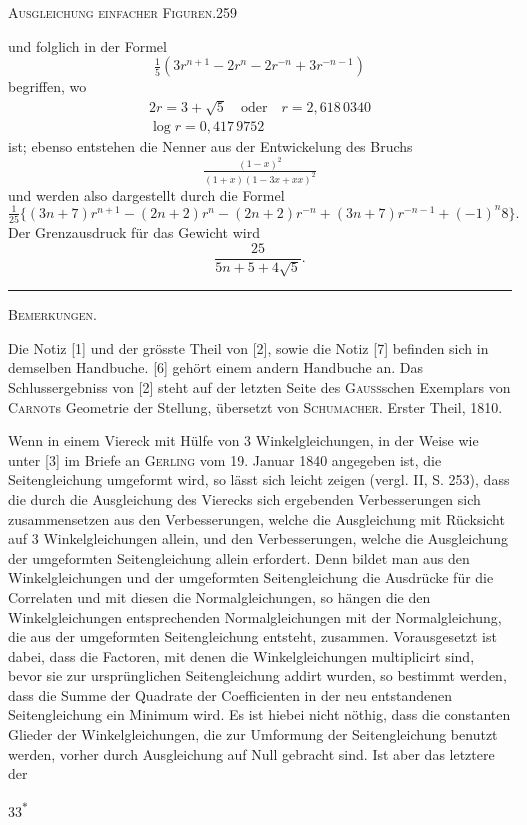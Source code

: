\clearpage
\noindent\mbox{}\hfill\textsc{Ausgleichung einfacher Figuren.}\hfill259\par\medskip
\noindent und folglich in der Formel
\[
\tfrac15(3r^{n+1}-2r^n-2r^{-n}+3r^{-n-1})
\]
\noindent begriffen, wo
\[
\begin{gathered}
2r=3+\sqrt5\quad\text{oder}\quad r=2{,}618\,0340\\
\log r=0{,}417\,9752
\end{gathered}
\]
\noindent ist; ebenso entstehen die Nenner aus der Entwickelung des Bruchs
\[
\tfrac{(1-x)^2}{(1+x)(1-3x+xx)^2}
\]
\noindent und werden also dargestellt durch die Formel
\[
\tfrac1{25}\{(3n+7)r^{n+1}-(2n+2)r^n-(2n+2)r^{-n}+(3n+7)r^{-n-1}+(-1)^n8\}.
\]
Der Grenzausdruck für das Gewicht wird
\[
\frac{25}{5n+5+4\sqrt5}.
\]
\begin{center}\rule{3cm}{.4pt}\end{center}
\bigskip
\begin{center}\textsc{Bemerkungen.}\end{center}
\begingroup\footnotesize
Die Notiz [1] und der grösste Theil von [2], sowie die Notiz [7] befinden sich in demselben Handbuche. [6] gehört einem andern Handbuche an. Das Schlussergebniss von [2] steht auf der letzten Seite des \textsc{Gauss}schen Exemplars von \textsc{Carnot}s Geometrie der Stellung, übersetzt von \textsc{Schumacher}. Erster Theil, 1810.

Wenn in einem Viereck mit Hülfe von 3 Winkelgleichungen, in der Weise wie unter [3] im Briefe an \textsc{Gerling} vom 19. Januar 1840 angegeben ist, die Seitengleichung umgeformt wird, so lässt sich leicht zeigen (vergl. II, S. 253), dass die durch die Ausgleichung des Vierecks sich ergebenden Verbesserungen sich zusammensetzen aus den Verbesserungen, welche die Ausgleichung mit Rücksicht auf 3 Winkelgleichungen allein, und den Verbesserungen, welche die Ausgleichung der umgeformten Seitengleichung allein erfordert. Denn bildet man aus den Winkelgleichungen und der umgeformten Seitengleichung die Ausdrücke für die Correlaten und mit diesen die Normalgleichungen, so hängen die den Winkelgleichungen entsprechenden Normalgleichungen mit der Normalgleichung, die aus der umgeformten Seitengleichung entsteht,  zusammen. Vorausgesetzt ist dabei, dass die Factoren, mit denen die Winkelgleichungen multiplicirt sind, bevor sie zur ursprünglichen Seitengleichung addirt wurden, so bestimmt werden, dass die Summe der Quadrate der Coefficienten in der neu entstandenen Seitengleichung ein Minimum wird. Es ist hiebei nicht nöthig, dass die constanten Glieder der Winkelgleichungen, die zur Umformung der Seitengleichung benutzt werden, vorher durch Ausgleichung auf Null gebracht sind. Ist aber das letztere der
\par\endgroup
\vfill\noindent\hfill33\textsuperscript{$\ast$}\hspace*{2cm}

